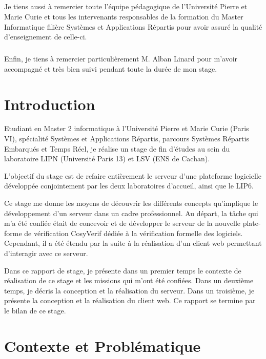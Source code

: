 \documentclass{report}
\begin{document}
\paragraph{}
Je tiens aussi à remercier toute l'équipe pédagogique de l'Université Pierre et Marie Curie et tous les intervenants 
responsables de la formation du Master Informatique filière Systèmes et Applications Répartis pour avoir assuré la qualité
d’enseignement de celle-ci.

\paragraph{}
Enfin, je tiens à remercier particulièrement M. Alban Linard pour m'avoir accompagné et très bien suivi pendant toute la 
durée de mon stage.


\chapter*{Introduction}

Etudiant en Master 2 informatique à l’Université Pierre et Marie Curie (Paris VI), spécialité Systèmes et Applications 
Répartis, parcours Systèmes Répartis Embarqués et Temps Réel, je réalise un stage de fin d'études au sein du laboratoire 
LIPN (Université Paris 13) et LSV (ENS de Cachan).

L'objectif du stage est de refaire entièrement le serveur d'une plateforme
logicielle
développée conjointement par les deux laboratoires d'accueil, ainsi que le
LIP6.

Ce stage me donne les moyens de découvrir les différents concepts qu'implique le développement d'un serveur dans un cadre 
professionnel. Au départ, la tâche qui m'a été confiée était de concevoir et de développer le serveur de la nouvelle plate-forme 
de vérification CosyVerif dédiée à la vérification formelle des logiciels.
Cependant, il a été étendu par la suite à la réalisation d'un 
client web permettant d'interagir avec ce serveur.

Dans ce rapport de stage, je présente dans un premier temps le contexte de réalisation de ce stage et les missions 
qui m'ont été confiées. Dans un deuxième temps, je décris la conception et la réalisation du serveur. Dans un troisième,
je présente la conception et la réalisation du client web.
Ce rapport se termine par le bilan de ce stage.

\chapter{Contexte et Problématique}
\end{document}
